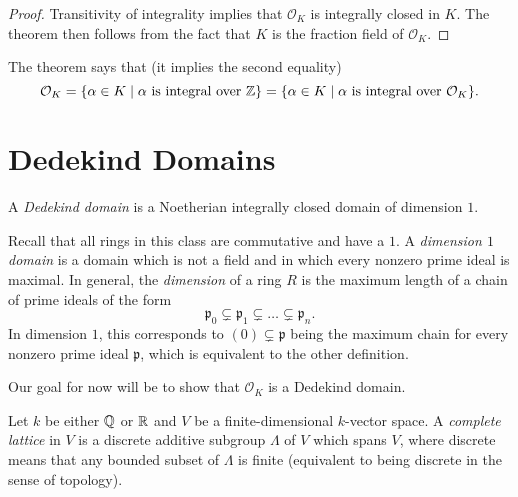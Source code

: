 \begin{proof}
  Transitivity of integrality implies that $\mathcal{O}_K$
  is integrally closed in $K$. The theorem then
  follows from the fact that $K$ is the fraction field
  of $\mathcal{O}_K$.
\end{proof}

\begin{remark}
  The theorem says that (it implies the second equality)
  \[
    \mathcal{O}_K
    = \{\alpha \in K \mid \text{$\alpha$ is integral over $\mathbb{Z}$}\}
    = \{\alpha \in K \mid \text{$\alpha$ is integral over $\mathcal{O}_K$}\}.
  \]
\end{remark}

\section{Dedekind Domains}

\begin{definition}
  A \emph{Dedekind domain} is a Noetherian
  integrally closed domain of dimension $1$.
\end{definition}

\begin{remark}
  Recall that all rings in this class are commutative
  and have a $1$. A \emph{dimension $1$ domain} is a
  domain
  which is not a field and in which every nonzero prime
  ideal
  is maximal. In general, the \emph{dimension} of a ring $R$
  is the maximum length of a chain of prime ideals
  of the form
  \[
    \mathfrak{p}_0 \subsetneq \mathfrak{p}_1 \subsetneq \dots \subsetneq \mathfrak{p}_n.
  \]
  In dimension $1$, this corresponds to
  $(0) \subsetneq \mathfrak{p}$ being the maximum
  chain for every nonzero prime
  ideal $\mathfrak{p}$, which is equivalent to the
  other definition.
\end{remark}

\begin{remark}
  Our goal for now will be to show that $\mathcal{O}_K$
  is a Dedekind domain.
\end{remark}

\begin{definition}
  Let $k$ be either $\mathbb{Q}$ or $\mathbb{R}$ and
  $V$ be a finite-dimensional $k$-vector
  space. A \emph{complete lattice} in $V$ is a
  discrete additive subgroup $\Lambda$ of $V$ which
  spans $V$, where discrete means that any
  bounded subset of $\Lambda$ is finite (equivalent to
  being discrete in the sense of topology).
\end{definition}


